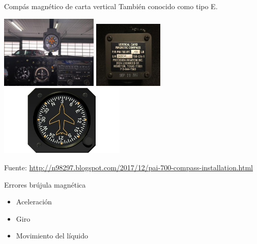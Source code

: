 \begin{frame}{Comp\'as magn\'etico de carta vertical}
  Tambi\'en conocido como tipo E.

  \includegraphics[width=0.35\textwidth]{05.instrumentos.giroscopicos.imagenes/05.04.MagnetismoTerrestre/05-04-IMG_6513.JPG} \hspace{1mm}
      \includegraphics[width=0.25\textwidth]{05.instrumentos.giroscopicos.imagenes/05.04.MagnetismoTerrestre/05-04-IMG_6464.JPG} \hspace{1mm}
      \includegraphics[width=0.45\textwidth]{05.instrumentos.giroscopicos.imagenes/05.04.MagnetismoTerrestre/05-04-VerticalCardCompass.jpg}
      
  {\tiny Fuente: \url{http://n98297.blogspot.com/2017/12/pai-700-compass-installation.html}}
\end{frame}


\begin{frame}

  \begin{alertblock}{Errores  br\'ujula magn\'etica}
    \begin{itemize}
    \item Aceleraci\'on
    \item Giro
    \item Movimiento del l\'iquido
    \end{itemize}
  \end{alertblock}

\end{frame}

